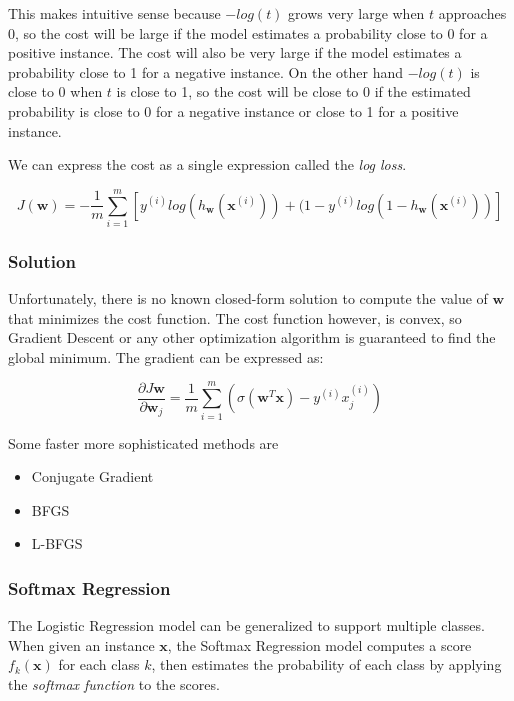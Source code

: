 \documentclass[12pt]{article}
\begin{document}
            This makes intuitive sense because $-log(t)$ grows very large when $t$ approaches 0, so the cost will be large if the model estimates a probability close to 0 for a positive instance.
            The cost will also be very large if the model estimates a probability close to 1 for a negative instance. On the other hand $-log(t)$ is close to 0 when $t$ is close to 1, so the cost
            will be close to 0 if the estimated probability is close to 0 for a negative instance or close to 1 for a positive instance.

            We can express the cost as a single expression called the \textit{log loss}. 

            $$J(\boldsymbol{w}) = -\frac{1}{m}\sum_{i=1}^m[y^{(i)} log(h_{\boldsymbol{w}}(\boldsymbol{x}^{(i)})) + (1-y^{(i)}log(1-h_{\boldsymbol{w}}(\boldsymbol{x}^{(i)}))] $$

        \subsubsection{Solution}
            Unfortunately, there is no known closed-form solution to compute the value of $\boldsymbol{w}$ that minimizes the cost function. The cost function however, is convex, so Gradient Descent or 
            any other optimization algorithm is guaranteed to find the global minimum. The gradient can be expressed as:

            $$ \frac{\partial J{\boldsymbol{w}}}{\partial \boldsymbol{w}_j} = \frac{1}{m}\sum_{i=1}^m(\sigma(\boldsymbol{w}^T\boldsymbol{x}) - y^{(i)} x_j^{(i)}) $$
            
            Some faster more sophisticated methods are
            \begin{itemize}
                \item Conjugate Gradient
                \item BFGS
                \item L-BFGS
            \end{itemize}

        \subsubsection{Softmax Regression}
            The Logistic Regression model can be generalized to support multiple classes. When given an instance $\boldsymbol{x}$, the Softmax Regression model computes a score $f_k(\boldsymbol{x})$ for each class $k$,
            then estimates the probability of each class by applying the \textit{softmax function} to the scores. 
\end{document}
